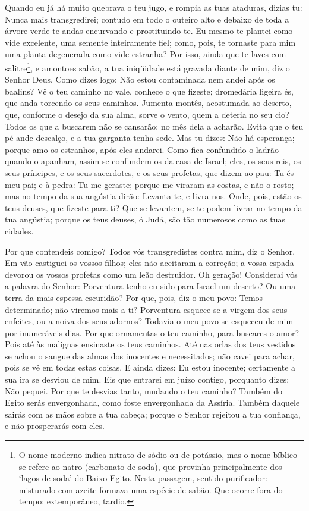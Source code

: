 Quando eu já há muito quebrava o teu jugo, e rompia as tuas
ataduras, dizias tu: Nunca mais transgredirei; contudo em todo o
outeiro alto e debaixo de toda a árvore verde te andas encurvando e
prostituindo-te. Eu mesmo te plantei como vide excelente, uma
semente inteiramente fiel; como, pois, te tornaste para mim uma
planta degenerada como vide estranha? Por isso, ainda que te
laves com salitre\footnote{O nome moderno indica nitrato de sódio ou
de potássio, mas o nome bíblico se refere ao natro (carbonato de
soda), que provinha principalmente dos `lagos de soda' do Baixo
Egito. Nesta passagem, sentido purificador: misturado com azeite
formava uma espécie de sabão. Que ocorre fora do tempo;
extemporâneo, tardio.}, e amontoes sabão, a tua iniqüidade está
gravada diante de mim, diz o Senhor Deus. Como dizes logo:
Não estou contaminada nem andei após os baalins? Vê o teu caminho no
vale, conhece o que fizeste; dromedária ligeira és, que anda
torcendo os seus caminhos. Jumenta montês, acostumada ao
deserto, que, conforme o desejo da sua alma, sorve o vento, quem a
deteria no seu cio? Todos os que a buscarem não se cansarão; no mês
dela a acharão. Evita que o teu pé ande descalço, e a tua
garganta tenha sede. Mas tu dizes: Não há esperança; porque amo os
estranhos, após eles andarei. Como fica confundido o ladrão
quando o apanham, assim se confundem os da casa de Israel; eles, os
seus reis, os seus príncipes, e os seus sacerdotes, e os seus
profetas, que dizem ao pau: Tu és meu pai; e à pedra: Tu me
geraste; porque me viraram as costas, e não o rosto; mas no tempo da
sua angústia dirão: Levanta-te, e livra-nos. Onde, pois,
estão os teus deuses, que fizeste para ti? Que se levantem, se te
podem livrar no tempo da tua angústia; porque os teus deuses, ó
Judá, são tão numerosos como as tuas cidades.

Por que contendeis comigo? Todos vós transgredistes contra mim,
diz o Senhor. Em vão castiguei os vossos filhos; eles não
aceitaram a correção; a vossa espada devorou os vossos profetas como
um leão destruidor. Oh geração! Considerai vós a palavra do
Senhor: Porventura tenho eu sido para Israel um deserto? Ou uma
terra da mais espessa escuridão? Por que, pois, diz o meu povo:
Temos determinado; não viremos mais a ti? Porventura
esquece-se a virgem dos seus enfeites, ou a noiva dos seus adornos?
Todavia o meu povo se esqueceu de mim por inumeráveis dias.
Por que ornamentas o teu caminho, para buscares o amor? Pois
até às malignas ensinaste os teus caminhos. Até nas orlas dos
teus vestidos se achou o sangue das almas dos inocentes e
necessitados; não cavei para achar, pois se vê em todas estas
coisas. E ainda dizes: Eu estou inocente; certamente a sua
ira se desviou de mim. Eis que entrarei em juízo contigo, porquanto
dizes: Não pequei. Por que te desvias tanto, mudando o teu
caminho? Também do Egito serás envergonhada, como foste envergonhada
da Assíria. Também daquele sairás com as mãos sobre a tua
cabeça; porque o Senhor rejeitou a tua confiança, e não prosperarás
com eles.

